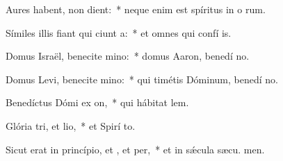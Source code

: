 \item Aures habent,  non dient:~* neque enim est spíritus in o rum.
\item Símiles illis fiant qui ciunt a:~* et omnes qui confí  is.
\item Domus Israël, benecite mino:~* domus Aaron, benedí no.
\item Domus Levi, benecite mino:~* qui timétis Dóminum, benedí no.
\item Benedíctus Dómi ex on,~* qui hábitat  lem.
\item Glória tri, et lio,~* et Spirí to.
\item Sicut erat in princípio, et , et per,~* et in sǽcula sæcu. men.
